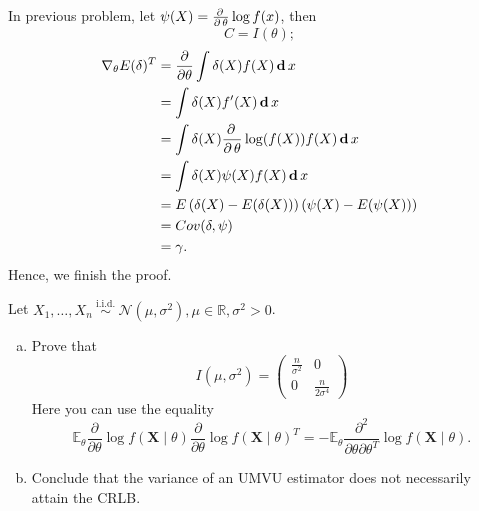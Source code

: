 \begin{solution}
    In previous problem, let $\psi(X)=\frac{\partial\, }{\partial\, \theta}\log f(x)$, then
    \[
        C=I(\theta); 
    \]
    \[
        \begin{aligned}
            \nabla_\theta E(\delta)^T&=\frac{\partial}{\partial \theta}\int \delta(X)f(X)\,\mathbf{d}\, x\\
            &=\int\delta(X)f'(X)\,\mathbf{d}\, x\\
            &=\int\delta(X)\frac{\partial\,}{\partial\, \theta}\log(f(X))f(X)\,\mathbf{d}\, x\\
            &=\int\delta(X)\psi(X)f(X)\,\mathbf{d}\, x\\
            &=E\left(\delta(X)-E(\delta(X))\right)\left(\psi(X)-E(\psi(X))\right)\\
            &=Cov(\delta, \psi)\\
            &=\gamma. 
        \end{aligned}
    \]
    Hence, we finish the proof. 
\end{solution}

\begin{ex}
    Let \(X_{1}, \ldots, X_{n} \stackrel{\text { i.i.d. }}{\sim} \mathcal{N}\left(\mu, \sigma^{2}\right), \mu \in \mathbb{R}, \sigma^{2}>0\). 
    \begin{enumerate}[(a)]
        \item Prove that
        \[
        I\left(\mu, \sigma^{2}\right)=\left(\begin{array}{cc}
        \frac{n}{\sigma^{2}} & 0 \\
        0 & \frac{n}{2 \sigma^{4}}
        \end{array}\right)
        \]
        Here you can use the equality
        \[
        \mathbb{E}_{\theta} \frac{\partial}{\partial \theta} \log f(\mathbf{X} \mid \theta) \frac{\partial}{\partial \theta} \log f(\mathbf{X} \mid \theta)^T=-\mathbb{E}_{\theta} \frac{\partial^{2}}{\partial \theta \partial \theta^T} \log f(\mathbf{X} \mid \theta). 
        \]
        \item Conclude that the variance of an UMVU estimator does not necessarily attain the CRLB. 
    \end{enumerate}
\end{ex}

